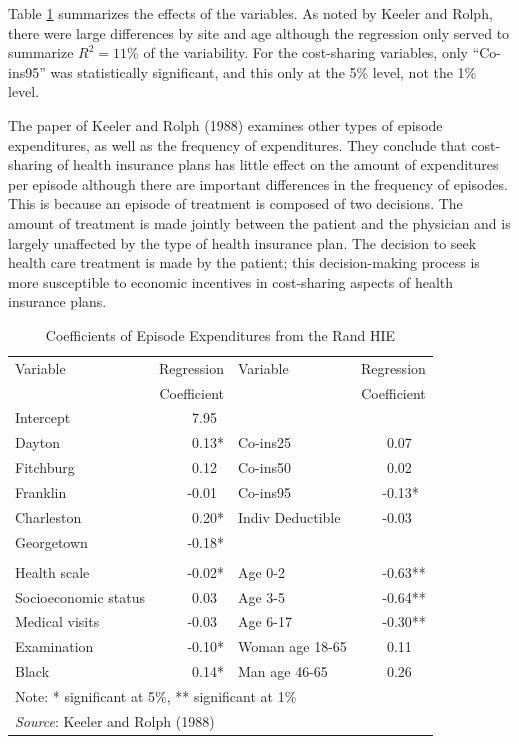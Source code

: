 Table \ref{T4:RandHIECoefficients} summarizes the effects of the
variables. As noted by Keeler and Rolph, there were large
differences by site and age although the regression only served to
summarize $R^2=11\%$ of the variability. For the cost-sharing
variables, only ``Co-ins95'' was statistically significant, and this
only at the 5\% level, not the 1\% level.

The paper of Keeler and Rolph (1988) examines other types of episode
expenditures, as well as the frequency of expenditures. They
conclude that cost-sharing of health insurance plans has little
effect on the amount of expenditures per episode although there are
important differences in the frequency of episodes. This is because
an episode of treatment is composed of two decisions. The amount of
treatment is made jointly between the patient and the physician and
is largely unaffected by the type of health insurance plan. The
decision to seek health care treatment is made by the patient; this
decision-making process is more susceptible to economic incentives
in cost-sharing aspects of health insurance plans.


\begin{table}[h]
\caption{\label{T4:RandHIECoefficients} Coefficients of Episode
Expenditures from the Rand HIE}
\begin{tabular}{lr|lr}
   \hline
  Variable & Regression &   Variable & Regression \\
           & Coefficient &           & Coefficient \\
\hline
    Intercept &       7.95~ &            &            \\
    Dayton &       0.13* &    Co-ins25 &       0.07~~ \\
 Fitchburg &       0.12~ &    Co-ins50 &       0.02~~ \\
  Franklin &      -0.01~ &    Co-ins95 &      -0.13*~ \\
Charleston &       0.20* &    Indiv Deductible &      -0.03~~ \\
Georgetown &      -0.18* &            &            \\
           &            &            &            \\
Health scale &     -0.02* &    Age 0-2 &      -0.63** \\
Socioeconomic status &  0.03~ &    Age 3-5 &      -0.64** \\
Medical visits &      -0.03~ &   Age 6-17 &      -0.30** \\
Examination &      -0.10* & Woman age 18-65 &       0.11~~ \\
     Black &       0.14* & Man age 46-65 &       0.26~~ \\
 \hline
\multicolumn{4}{l}{Note: * significant at 5\%, ** significant at 1\%} \\
     \multicolumn{4}{l}{\textit{Source}: Keeler and Rolph (1988)} \\
      \hline
\end{tabular}
\end{table}

